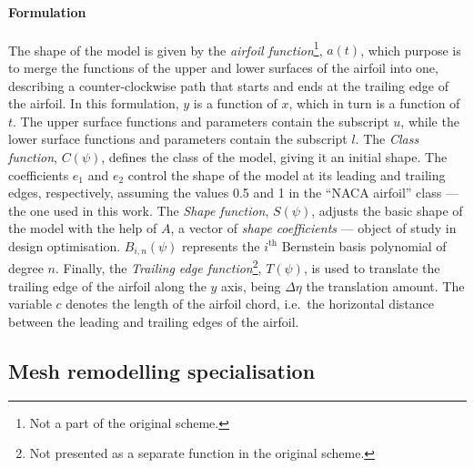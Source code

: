 \paragraph{Formulation} The shape of the model is given by the \textit{airfoil function}\footnote{Not a part of the original scheme.}, $a(t)$, which purpose is to merge the functions of the upper and lower surfaces of the airfoil into one, describing a counter-clockwise path that starts and ends at the trailing edge of the airfoil. In this formulation, $y$ is a function of $x$, which in turn is a function of $t$. The upper surface functions and parameters contain the subscript $u$, while the lower surface functions and parameters contain the subscript $l$. The \textit{Class function}, $C(\psi)$, defines the class of the model, giving it an initial shape. The coefficients $e_1$ and $e_2$ control the shape of the model at its leading and trailing edges, respectively, assuming the values 0.5 and 1 in the ``NACA airfoil'' class --- the one used in this work. The \textit{Shape function}, $S(\psi)$, adjusts the basic shape of the model with the help of $A$, a vector of \textit{shape coefficients} --- object of study in design optimisation. $B_{i,n}(\psi)$ represents the $i^\text{th}$ Bernstein basis polynomial of degree $n$. Finally, the \textit{Trailing edge function}\footnote{Not presented as a separate function in the original scheme.}, $T(\psi)$, is used to translate the trailing edge of the airfoil along the $y$ axis, being $\Delta\eta$ the translation amount. The variable $c$ denotes the length of the airfoil chord, i.e.\ the horizontal distance between the leading and trailing edges of the airfoil.

\subsection{Mesh remodelling specialisation}

